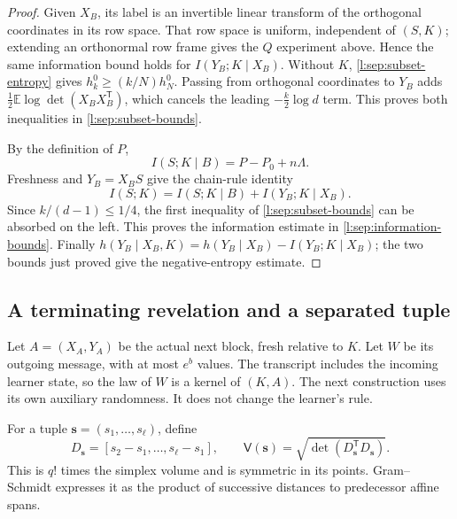 \begin{proof}
Given \(X_B\), its label is an invertible linear transform of the
orthogonal coordinates in its row space.  That row space is uniform,
independent of \((S,K)\); extending an orthonormal row frame gives
the \(Q\) experiment above.  Hence the same information bound holds
for \(I(Y_B;K\mid X_B)\).  Without \(K\),
\eqref{l:sep:subset-entropy} gives
\(h_k^0\ge(k/N)h_N^0\).  Passing from orthogonal coordinates to
\(Y_B\) adds
\(\tfrac12\mathbb E\log\det(X_BX_B^{\mathsf T})\), which cancels
the leading \(-\tfrac{k}{2}\log d\) term.  This proves both
inequalities in \eqref{l:sep:subset-bounds}.

By the definition of \(P\),
\[
 I(S;K\mid B)=P-P_0+n\Lambda.
\]
Freshness and \(Y_B=X_BS\) give the chain-rule identity
\[
 I(S;K)=I(S;K\mid B)+I(Y_B;K\mid X_B).
\]
Since \(k/(d-1)\le1/4\), the first inequality of
\eqref{l:sep:subset-bounds} can be absorbed on the left.
This proves the information estimate in
\eqref{l:sep:information-bounds}.  Finally
\(h(Y_B\mid X_B,K)=h(Y_B\mid X_B)-I(Y_B;K\mid X_B)\);
the two bounds just proved give the negative-entropy estimate.
\end{proof}

\subsection{A terminating revelation and a separated tuple}

Let \(A=(X_A,Y_A)\) be the actual next block, fresh relative to \(K\).
Let \(W\) be its outgoing message, with at most \(e^b\) values.
The transcript includes the incoming learner state, so the law of
\(W\) is a kernel of \((K,A)\).  The next construction uses its own
auxiliary randomness.  It does not change the learner's rule.

For a tuple \(\mathbf s=(s_1,\ldots,s_\ell)\), define
\[
 D_{\mathbf s}=[s_2-s_1,\ldots,s_\ell-s_1],\qquad
 \mathsf V(\mathbf s)=\sqrt{\det(D_{\mathbf s}^{\mathsf T}D_{\mathbf s})}.
\]
This is \(q!\) times the simplex volume and is symmetric in its
points.  Gram--Schmidt expresses it as the product of successive
distances to predecessor affine spans.

